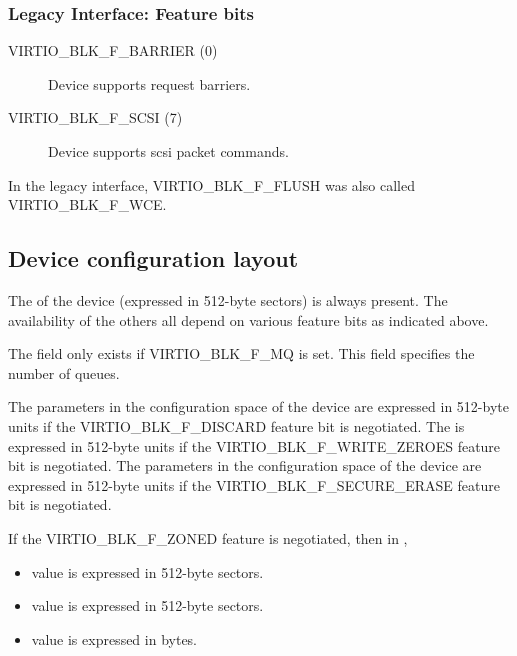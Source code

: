 \subsubsection{Legacy Interface: Feature bits}\label{sec:Device Types / Block Device / Feature bits / Legacy Interface: Feature bits}

\begin{description}
\item[VIRTIO_BLK_F_BARRIER (0)] Device supports request barriers.

\item[VIRTIO_BLK_F_SCSI (7)] Device supports scsi packet commands.
\end{description}

\begin{note}
  In the legacy interface, VIRTIO_BLK_F_FLUSH was also
  called VIRTIO_BLK_F_WCE.
\end{note}

\subsection{Device configuration layout}\label{sec:Device Types / Block Device / Device configuration layout}

The  of the device (expressed in 512-byte sectors) is always
present. The availability of the others all depend on various feature
bits as indicated above.

The field  only exists if VIRTIO_BLK_F_MQ is set. This field specifies
the number of queues.

The parameters in the configuration space of the device 
 are expressed in 512-byte units if the
VIRTIO_BLK_F_DISCARD feature bit is negotiated. The 
is expressed in 512-byte units if the VIRTIO_BLK_F_WRITE_ZEROES feature
bit is negotiated. The parameters in the configuration space of the device
  are expressed
in 512-byte units if the VIRTIO_BLK_F_SECURE_ERASE feature bit is negotiated.

If the VIRTIO_BLK_F_ZONED feature is negotiated, then in
,
\begin{itemize}
\item {} value is expressed in 512-byte sectors.
\item {} value is expressed in 512-byte sectors.
\item {} value is expressed in bytes.
\end{itemize}

